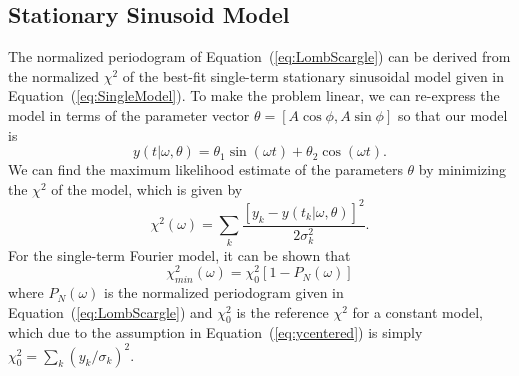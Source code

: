 \documentclass[12pt,preprint]{aastex}
\newcommand{\Eq}[1]{Equation~(\ref{eq:#1})}
\newcommand{\eq}[1]{\Eq{#1}}
\newcommand{\eqlabel}[1]{\label{eq:#1}}
\begin{document}
\subsection{Stationary Sinusoid Model}

The normalized periodogram of \eq{LombScargle} can be derived from the normalized $\chi^2$ of the best-fit single-term stationary sinusoidal model given in \eq{SingleModel}. To make the problem linear, we can re-express the model in terms of the parameter vector $\theta = [A\cos\phi, A\sin\phi]$ so that our model is
\begin{equation}
  \eqlabel{simplemodel}
  y(t|\omega,\theta) = \theta_1\sin(\omega t) + \theta_2\cos(\omega t).
\end{equation}
We can find the maximum likelihood estimate of the parameters $\theta$ by minimizing the $\chi^2$ of the model, which is given by
\begin{equation}
  \chi^2(\omega) = \sum_k \frac{[y_k - y(t_k|\omega,\theta)]^2}{2\sigma_k^2}.
\end{equation}
For the single-term Fourier model, it can be shown \citep[See, e.g.][]{ICVG2014} that
\begin{equation}
  \eqlabel{chi2PN}
  \chi_{min}^2(\omega) = \chi^2_0[1 - P_N(\omega)]
\end{equation}
where $P_N(\omega)$ is the normalized periodogram given in \eq{LombScargle} and $\chi^2_0$ is the reference $\chi^2$ for a constant model, which due to the assumption in \eq{ycentered} is simply $\chi^2_0 = \sum_k (y_k/\sigma_k)^2$.
\end{document}
